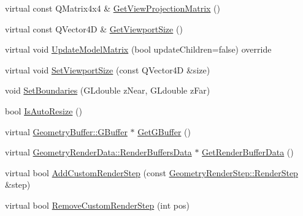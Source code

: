 \begin{DoxyCompactItemize}
virtual const Q\+Matrix4x4 \& \mbox{\hyperlink{class_geometry_engine_1_1_geometry_world_item_1_1_geometry_camera_1_1_camera_a22afa49db8d7aa71d24b9fed728ab381}{Get\+View\+Projection\+Matrix}} ()
\item 
virtual const Q\+Vector4D \& \mbox{\hyperlink{class_geometry_engine_1_1_geometry_world_item_1_1_geometry_camera_1_1_camera_a633facf8168c7bc943e256732cfb78dc}{Get\+Viewport\+Size}} ()
\item 
virtual void \mbox{\hyperlink{class_geometry_engine_1_1_geometry_world_item_1_1_geometry_camera_1_1_camera_afe7145a1edb13ce3a50c2964f5c865e9}{Update\+Model\+Matrix}} (bool update\+Children=false) override
\item 
virtual void \mbox{\hyperlink{class_geometry_engine_1_1_geometry_world_item_1_1_geometry_camera_1_1_camera_a96954629a05eba955adc1dff2df1fbdb}{Set\+Viewport\+Size}} (const Q\+Vector4D \&size)
\item 
void \mbox{\hyperlink{class_geometry_engine_1_1_geometry_world_item_1_1_geometry_camera_1_1_camera_acf991463c9975a3b0dd047bb73a7dc95}{Set\+Boundaries}} (G\+Ldouble z\+Near, G\+Ldouble z\+Far)
\item 
bool \mbox{\hyperlink{class_geometry_engine_1_1_geometry_world_item_1_1_geometry_camera_1_1_camera_a48e1e7bfc2aea19d21ecf5a311815740}{Is\+Auto\+Resize}} ()
\item 
virtual \mbox{\hyperlink{class_geometry_engine_1_1_geometry_buffer_1_1_g_buffer}{Geometry\+Buffer\+::\+G\+Buffer}} $\ast$ \mbox{\hyperlink{class_geometry_engine_1_1_geometry_world_item_1_1_geometry_camera_1_1_camera_a23673bed2b417962168e0bc5b8b37eb3}{Get\+G\+Buffer}} ()
\item 
virtual \mbox{\hyperlink{class_geometry_engine_1_1_geometry_render_data_1_1_render_buffers_data}{Geometry\+Render\+Data\+::\+Render\+Buffers\+Data}} $\ast$ \mbox{\hyperlink{class_geometry_engine_1_1_geometry_world_item_1_1_geometry_camera_1_1_camera_a467c210c6d8cb819537b6a058bed649b}{Get\+Render\+Buffer\+Data}} ()
\item 
virtual bool \mbox{\hyperlink{class_geometry_engine_1_1_geometry_world_item_1_1_geometry_camera_1_1_camera_a548c5c566cc732b7d0c00aca94cdcbbe}{Add\+Custom\+Render\+Step}} (const \mbox{\hyperlink{class_geometry_engine_1_1_geometry_render_step_1_1_render_step}{Geometry\+Render\+Step\+::\+Render\+Step}} \&step)
\item 
virtual bool \mbox{\hyperlink{class_geometry_engine_1_1_geometry_world_item_1_1_geometry_camera_1_1_camera_adb12d29b67837c4d5e5c94f6cb956bbd}{Remove\+Custom\+Render\+Step}} (int pos)

\end{DoxyCompactItemize}
